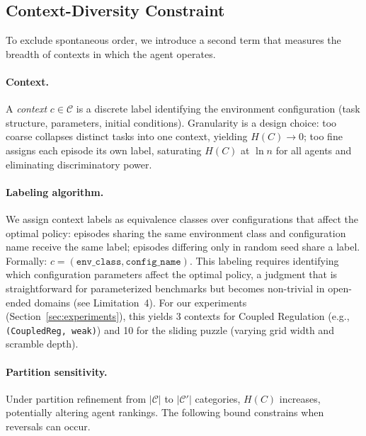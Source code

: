 \documentclass[runningheads,a4paper]{llncs}
\begin{document}
\subsection{Context-Diversity Constraint}
\label{sec:context-diversity}

To exclude spontaneous order, we introduce a second term that measures the breadth of contexts in which the agent operates.

\paragraph{Context.} A \emph{context} $c \in \mathcal{C}$ is a discrete label identifying the environment configuration (task structure, parameters, initial conditions). Granularity is a design choice: too coarse collapses distinct tasks into one context, yielding $H(C) \to 0$; too fine assigns each episode its own label, saturating $H(C)$ at $\ln n$ for all agents and eliminating discriminatory power.

\paragraph{Labeling algorithm.} We assign context labels as equivalence classes over configurations that affect the optimal policy: episodes sharing the same environment class and configuration name receive the same label; episodes differing only in random seed share a label. Formally: $c = (\texttt{env\_class}, \texttt{config\_name})$. This labeling requires identifying which configuration parameters affect the optimal policy, a judgment that is straightforward for parameterized benchmarks but becomes non-trivial in open-ended domains (see Limitation~4). For our experiments (Section~\ref{sec:experiments}), this yields 3 contexts for Coupled Regulation (e.g., \texttt{(CoupledReg, weak)}) and 10 for the sliding puzzle (varying grid width and scramble depth).

\paragraph{Partition sensitivity.} Under partition refinement from $|\mathcal{C}|$ to $|\mathcal{C}'|$ categories, $H(C)$ increases, potentially altering agent rankings. The following bound constrains when reversals can occur.
\end{document}
